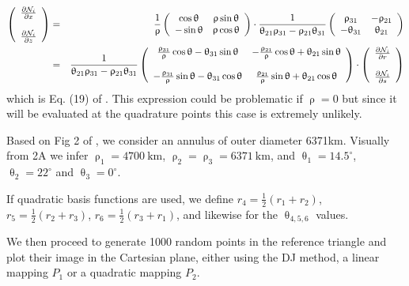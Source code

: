 \begin{eqnarray}
\left(
\begin{array}{c}    
\frac{\partial {\mathcal{N}}_i}{\partial x} \\ \\
\frac{\partial {\mathcal{N}}_i}{\partial z} 
\end{array}
\right)
&=&
\frac{1}{\uprho}
\left(
\begin{array}{cc}
\cos \uptheta & \uprho\sin\uptheta \\
-\sin\uptheta & \uprho\cos\uptheta
\end{array}
\right)\cdot
\frac{1}{\uptheta_{21}\uprho_{31}-\uprho_{21}\uptheta_{31}} 
\left(
\begin{array}{cc}
\uprho_{31} & -\uprho_{21} \\
-\uptheta_{31} & \uptheta_{21}
\end{array}
\right)
\nonumber\\
&=&
\frac{1}{\uptheta_{21}\uprho_{31}-\uprho_{21}\uptheta_{31}} 
\left(
\begin{array}{cc}
 \frac{\uprho_{31} }{\uprho} \cos\uptheta -\uptheta_{31}\sin\uptheta &  
-\frac{\uprho_{21} }{\uprho} \cos\uptheta +\uptheta_{21}\sin\uptheta \\ \\
-\frac{\uprho_{31} }{\uprho} \sin\uptheta -\uptheta_{31}\cos\uptheta &
 \frac{\uprho_{21} }{\uprho} \sin\uptheta +\uptheta_{21}\cos\uptheta 
\end{array}
\right)
\cdot
\left(
\begin{array}{c}
\frac{\partial {\mathcal{N}}_i}{\partial r} \\ \\
\frac{\partial {\mathcal{N}}_i}{\partial s} 
\end{array}
\right)
\end{eqnarray}
which is Eq. (19) of \textcite{moth20}.
This expression could be problematic if $\uprho=0$ but since it will be evaluated at the 
quadrature points this case is extremely unlikely.


Based on Fig 2 of \textcite{moth20}, we consider an annulus of outer diameter
6371km. Visually from 2A we infer $\uprho_1=4700~\si{\km}$, $\uprho_2=\uprho_3=6371~\si{\km}$, and 
$\uptheta_1=14.5^\circ$, $\uptheta_2=22^\circ$ and $\uptheta_3=0^\circ$.

If quadratic basis functions are used, we define 
$r_4=\frac12(r_1+r_2)$,
$r_5=\frac12(r_2+r_3)$,
$r_6=\frac12(r_3+r_1)$, and likewise for the $\uptheta_{4,5,6}$ values.

We then proceed to generate 1000 random points in the reference triangle and plot their image
in the Cartesian plane, either using the DJ method, a linear mapping $P_1$ or a quadratic mapping $P_2$.

